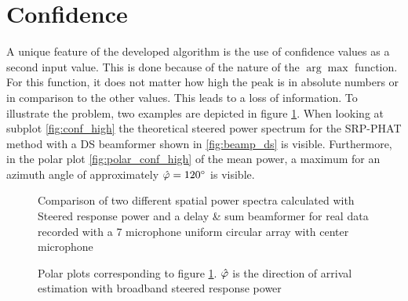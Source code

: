\section{Confidence}
\label{sec:confidence}
A unique feature of the developed algorithm is the use of confidence values as a second input value. This is done because of the nature of the $\arg \max$ function. For this function, it does not matter how high the peak is in absolute numbers or in comparison to the other values. This leads to a loss of information. To illustrate the problem, two examples are depicted in figure \ref{fig:compare_conf}. When looking at subplot \ref{fig:conf_high} the theoretical steered power spectrum for the \ac{SRP-PHAT} method with a \ac{DS} beamformer shown in \ref{fig:beamp_ds} is visible. Furthermore, in the polar plot \ref{fig:polar_conf_high} of the mean power, a maximum for an azimuth angle of approximately $\hat{\varphi} = \ang{120}$ is visible.

\begin{figure}[!ht]
	\hfill
	\caption{Comparison of two different spatial power spectra calculated with Steered response power and a delay \& sum beamformer for real data recorded with a 7 microphone uniform circular array with center microphone}
	\label{fig:compare_conf}
\end{figure}

\begin{figure}[!ht]
	\hfill
	\caption{Polar plots corresponding to figure \ref{fig:compare_conf}. $\hat{\varphi}$ is the direction of arrival estimation with broadband steered response power}
	\label{fig:compare_polar_conf}
\end{figure}

